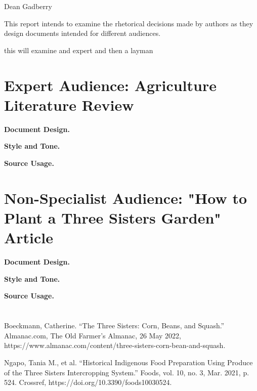 \documentclass[12pt,a4paper,english]{article}
\begin{document}
\section*{}
\begin{center}
Dean Gadberry
\end{center}
This report intends to examine the rhetorical decisions made by authors as they design documents intended for different audiences.
\par this will examine and expert and then a layman 
\section*{Expert Audience: Agriculture Literature Review}
\textbf{Document Design.}

\par
\textbf{Style and Tone.}

\textbf{Source Usage.}

\section*{Non-Specialist Audience: "How to Plant a Three Sisters Garden" Article}
\textbf{Document Design.}
\par
\textbf{Style and Tone.}

\textbf{Source Usage.}

\section*{}
\begin{hangparas}{2em}{1}
  Boeckmann, Catherine. “The Three Sisters: Corn, Beans, and Squash.” Almanac.com, The Old Farmer's Almanac, 26 May 2022, https://www.almanac.com/content/three-sisters-corn-bean-and-squash. 
  \par
  Ngapo, Tania M., et al. “Historical Indigenous Food Preparation Using Produce of the Three Sisters Intercropping System.” Foods, vol. 10, no. 3, Mar. 2021, p. 524. Crossref, https://doi.org/10.3390/foods10030524.
\end{hangparas}
\end{document}
